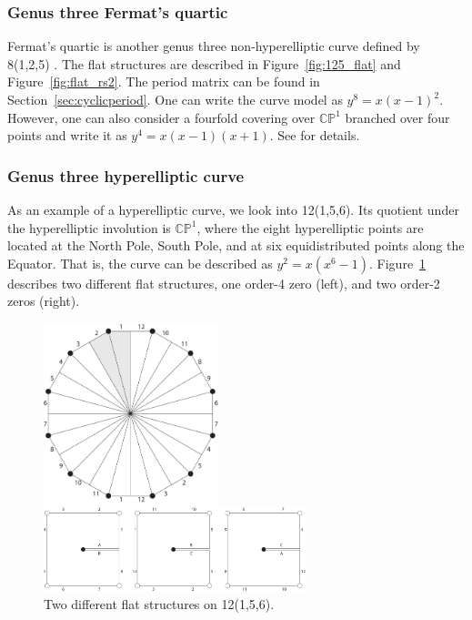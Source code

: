 \documentclass[12pt,reqno]{amsart}
\newcommand{\C}{\mathbb{C}}
\renewcommand{\P}{\mathbb{P}}
\theoremstyle{definition}
\theoremstyle{remark}
\begin{document}
\subsubsection{Genus three Fermat's quartic}
Fermat's quartic is another genus three non-hyperelliptic curve defined by 8(1,2,5) \cite{dami}. The flat structures are described in Figure~\ref{fig:125_flat} and Figure~\ref{fig:flat_rs2}. The period matrix can be found in Section~\ref{sec:cyclicperiod}. One can write the curve model as $y^8 = x (x-1)^2.$ However, one can also consider a fourfold covering over $\C\P^1$ branched over four points and write it as $y^4 = x (x-1) (x+1).$ See \cite{dami} for details.

\subsubsection{Genus three hyperelliptic curve}
As an example of a hyperelliptic curve, we look into 12(1,5,6). Its quotient under the hyperelliptic involution is $\C\P^1$, where the eight hyperelliptic points are located at the North Pole, South Pole, and at six equidistributed points along the Equator. That is, the curve can be described as $y^2 = x(x^6 -1).$ Figure~\ref{fig:156} describes two different flat structures, one order-4 zero (left), and two order-2 zeros (right).

\begin{figure}[htbp]
\centering
\begin{minipage}{0.5\textwidth}
  \centering
  \includegraphics[width=2in]{figures/156_flat.pdf}
\end{minipage}%
\begin{minipage}{0.5\textwidth}
  \centering
  \includegraphics[width=3in]{figures/156_flat_2.pdf}
\end{minipage}
  \caption{Two different flat structures on 12(1,5,6).}
  \label{fig:156}
\end{figure}
\end{document}
